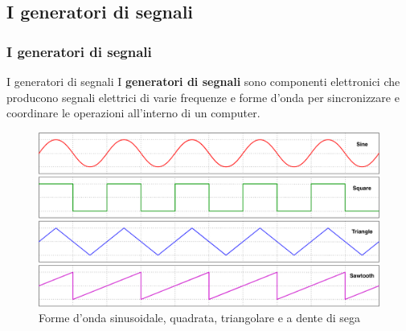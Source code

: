 \subsection[I generatori di segnali]{I generatori di segnali}
\begin{frame}
	\frametitle{I generatori di segnali}
	
	\begin{block}{I generatori di segnali}
		I \textbf{generatori di segnali} sono componenti elettronici che producono segnali elettrici di varie frequenze e forme d'onda per sincronizzare e coordinare le operazioni all'interno di un computer.
	\end{block}
	
	\begin{figure}[!htbp]
		\centering 
		\includegraphics[width=0.65\linewidth]{images/2_le_architetture/waveforms.pdf}
		\caption{Forme d'onda sinusoidale, quadrata, triangolare e a dente di sega}
		\label{fig:architectures_waveforms}
	\end{figure}
\end{frame}


